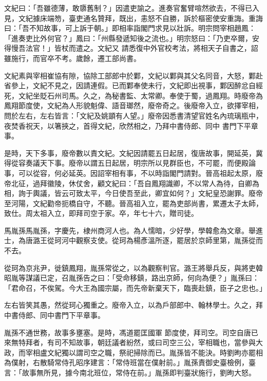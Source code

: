 \begin{pinyinscope}
 文紀曰：「吾雖德薄，敢隳舊制？」因遣吏諭之。進奏官奮臂喧然欲去，不得已入見，文紀據床端笏，臺吏通名贊拜，既出，恚怒不自勝，訴於樞密使安重誨。重誨曰：「吾不知故事，可上訴于朝。」即相率詣閣門求見以壯訴。明宗問宰相趙鳳：「進奏吏比外何官？」鳳曰：「州縣發遞知後之流也。」明宗怒曰：「乃吏卒爾，安得慢吾法官！」皆杖而遣之。文紀又
 請悉復中外官校考法，將相天子自書之，詔雖施行，而官卒不考。歲餘，遷工部尚書。



 文紀素與宰相崔協有隙，協除工部郎中於鄴，文紀以鄴與其父名同音，大怒，鄴赴省參上，文紀不見之，因請連假。已而鄴奉使未行，文紀即出視事，鄴因醉忿自經死，文紀坐貶石州司馬。久之，為秘書監、太常卿。奉使于蜀，過鳳翔。時廢帝為鳳翔節度使，文紀為人形貌魁偉、語音瑯然，廢帝奇之。後廢帝入立，欲擇宰相，問於左右，左右皆言：「文紀及姚顗有人望。」廢帝因悉書清望官姓名內琉璃瓶中，夜焚香祝天，以箸挾之，首得文紀，欣然相之，乃拜中書侍郎、同中
 書門下平章事。



 是時，天下多事，廢帝數以責文紀。文紀因請罷五日起居，復唐故事，開延英，冀得從容奏議天下事。廢帝以謂五日起居，明宗所以見群臣也，不可罷，而便殿論事，可以從容，何必延英。因詔宰相有事，不以時詣閣門請對。晉高祖起太原，廢帝北征，過拜徽陵，休仗舍，顧文紀曰：「吾自鳳翔識卿，不以常人為待，自卿為相，詢于輿議，皆云可致太平，今日使吾至此，卿宜如何？」文紀皇恐謝罪。廢帝至河陽，文紀勸帝扼橋自守，不聽。晉高祖入立，罷為吏部尚書，累遷太子太師，致仕。周太祖入立，即拜司空于家。卒，年七十六，贈司徒。



 馬胤孫馬胤孫，字慶先，棣州商河人也。為人懦暗，少好學，學韓愈為文章。舉進士，為唐潞王從珂河中觀察支使。從珂為楊彥溫所逐，罷居於京師里第，胤孫從而不去。



 從珂為京兆尹，徙鎮鳳翔，胤孫常從之，以為觀察判官。潞王將舉兵反，與將吏韓昭胤等謀議已定，召胤孫告之曰：「受命移鎮，路出京師，何向為便？」胤孫曰：「君命召，不俟駕。今大王為國宗屬，而先帝新棄天下，臨喪赴鎮，臣子之忠也。」



 左右皆笑其愚，然從珂心獨重之。廢帝入立，以為戶部郎中、翰林學士。久之，拜中書侍郎、同中書門下平章事。



 胤孫不通世務，故事多壅塞。是時，馮道罷匡國軍
 節度使，拜司空。司空自唐已來無特拜者，有司不知故事，朝廷議者紛然，或曰司空三公，宰相職也，當參與大政，而宰相盧文紀獨以謂司空之職，祭祀掃除而已。胤孫皆不能決。時劉昫亦罷相為僕射，右散騎常侍孔昭序建言：「常侍班當在僕射前。」胤孫責御史臺檢例，臺言：「故事無所見，據今南北班位，常侍在前。」胤孫即判臺狀施行，劉昫大怒。




\end{pinyinscope}
